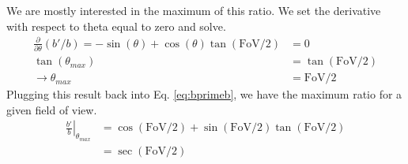 \documentclass{article}
\begin{document}
We are mostly interested in the maximum of this ratio. We set the derivative with respect to theta equal to zero and solve.
\begin{subequations}
\begin{align}
\frac{\partial}{\partial\theta}(b'/b)  = -\sin(\theta) + \cos(\theta)\tan(\mathrm{FoV}/2) &= 0 \\
 \tan(\theta_{max}) & = \tan(\mathrm{FoV}/2) \\
 \rightarrow \theta_{max} &= \mathrm{FoV}/2
\end{align}
\end{subequations}
Plugging this result back into Eq. \ref{eq:bprimeb}, we have the maximum ratio for a given field of view.
\begin{subequations}
\begin{align}
\left.\frac{b'}{b}\right\vert_{\theta_{max}} & = \cos(\mathrm{FoV}/2) + \sin(\mathrm{FoV}/2)\tan(\mathrm{FoV}/2) \\
& = \sec(\mathrm{FoV}/2)
\end{align}
\end{subequations}
\end{document}
